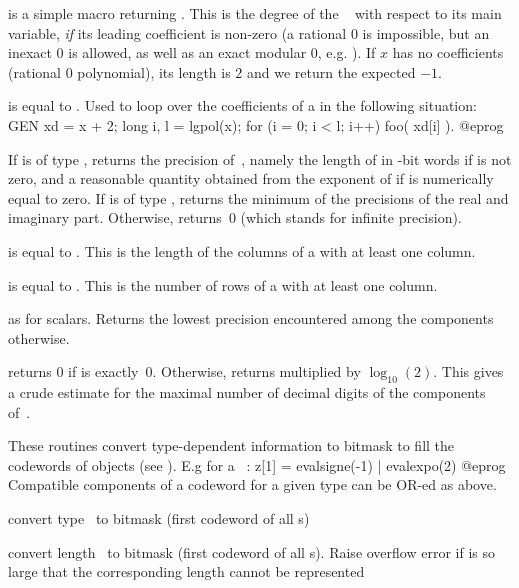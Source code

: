  is a simple macro returning .
This is the degree of the ~ with respect to its main
variable, \emph{if} its leading coefficient is non-zero (a rational $0$ is
impossible, but an inexact $0$ is allowed, as well as an exact modular $0$,
e.g. ). If $x$ has no coefficients (rational $0$ polynomial),
its length is $2$ and we return the expected $-1$.

 is equal to . Used to loop over
the coefficients of a  in the following situation:
\bprog
    GEN xd = x + 2;
    long i, l = lgpol(x);
    for (i = 0; i < l; i++) foo( xd[i] ).
@eprog

 If  is of type , returns the
precision of~, namely the length of  in \B-bit words if 
is not zero, and a reasonable quantity obtained from the exponent of 
if  is numerically equal to zero. If  is of type
, returns the minimum of the precisions of the real and
imaginary part. Otherwise, returns~0 (which stands for infinite precision).

 is equal to . This is the length
of the columns of a  with at least one column.

 is equal to . This is the number
of rows of a  with at least one column.

 as  for scalars. Returns the
lowest precision encountered among the components otherwise.

 returns 0 if  is exactly~0. Otherwise,
returns  multiplied by $\log_{10}(2)$. This gives a crude
estimate for the maximal number of decimal digits of the components
of~.

These routines convert type-dependent information to bitmask to fill the
codewords of  objects (see ). E.g for a
~:
\bprog
  z[1] = evalsigne(-1) | evalexpo(2)
@eprog
Compatible components of a codeword for a given type can be OR-ed as above.

 convert type~ to bitmask (first
codeword of all s)

 convert length~ to bitmask (first
codeword of all s). Raise overflow error if  is so large that
the corresponding length cannot be represented

